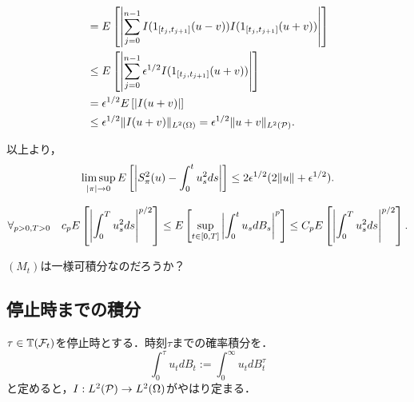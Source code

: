 \documentclass[uplatex,dvipdfmx]{jsreport}
\begin{document}
\begin{Proof}
\begin{description}
\begin{enumerate}[(a)]
\begin{align*}
                &=E\left[\left|\sum^{n-1}_{j=0}I(1_{[t_j,t_{j+1}]}(u-v))I(1_{[t_j,t_{j+1}]}(u+v))\right|\right]\\
                &\le E\left[\left|\sum^{n-1}_{j=0}\epsilon^{1/2}I(1_{[t_j,t_{j+1}]}(u+v))\right|\right]\\
                &=\epsilon^{1/2}E\left[\left|I(u+v)\right|\right]\\
                &\le\epsilon^{1/2}\|I(u+v)\|_{L^2(\Omega)}=\epsilon^{1/2}\|u+v\|_{L^2(\mathcal{P})}.
            \end{align*}
        \end{enumerate}
        以上より，
        \[\limsup_{\lvert\pi\rvert\to0}E\left[\left|S^2_\pi(u)-\int^t_0u^2_sds\right|\right]\le 2\epsilon^{1/2}(2\|u\|+\epsilon^{1/2}).\]
    \end{description}
\end{Proof}

\begin{corollary}
    \[\forall_{p>0,T>0}\quad c_pE\left[\left|\int^T_0u^2_sds\right|^{p/2}\right]\le E\left[\sup_{t\in[0,T]}\left|\int^t_0u_sdB_s\right|^p\right]\le C_pE\left[\left|\int^T_0u^2_sds\right|^{p/2}\right].\]
\end{corollary}
\begin{Proof}
    $(M_t)$は一様可積分なのだろうか？
\end{Proof}


\subsection{停止時までの積分}

\begin{definition}[停止時までの積分]
    $\tau\in\mathbb{T}(\mathcal{F}_t)$を停止時とする．時刻$\tau$までの確率積分を．
    \[\int^\tau_0u_tdB_t:=\int^\infty_0u_tdB^\tau_t\]
    と定めると，$I:L^2(\mathcal{P})\to L^2(\Omega)$がやはり定まる．
\end{definition}
\end{document}
